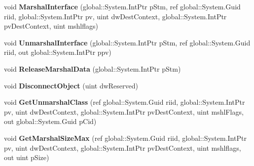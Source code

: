 \begin{DoxyCompactItemize}
void {\bfseries Marshal\+Interface} (global\+::\+System.\+Int\+Ptr p\+Stm, ref global\+::\+System.\+Guid riid, global\+::\+System.\+Int\+Ptr pv, uint dw\+Dest\+Context, global\+::\+System.\+Int\+Ptr pv\+Dest\+Context, uint mshlflags)
\item 
\mbox{\label{interface_system_1_1_runtime_1_1_interop_services_1_1_i_marshal_____system___runtime___windows_runtime_a3e8bcee1d02a9ee6b7ef2e3996b54765}} 
void {\bfseries Unmarshal\+Interface} (global\+::\+System.\+Int\+Ptr p\+Stm, ref global\+::\+System.\+Guid riid, out global\+::\+System.\+Int\+Ptr ppv)
\item 
\mbox{\label{interface_system_1_1_runtime_1_1_interop_services_1_1_i_marshal_____system___runtime___windows_runtime_a3b9d876c6a7a35f23897b4e47568578c}} 
void {\bfseries Release\+Marshal\+Data} (global\+::\+System.\+Int\+Ptr p\+Stm)
\item 
\mbox{\label{interface_system_1_1_runtime_1_1_interop_services_1_1_i_marshal_____system___runtime___windows_runtime_a6c9ed45c61839a823eaeb6e035dd2e25}} 
void {\bfseries Disconnect\+Object} (uint dw\+Reserved)
\item 
\mbox{\label{interface_system_1_1_runtime_1_1_interop_services_1_1_i_marshal_____system___runtime___windows_runtime_ac0f4d724dea939dbf088fe46a53dec1a}} 
void {\bfseries Get\+Unmarshal\+Class} (ref global\+::\+System.\+Guid riid, global\+::\+System.\+Int\+Ptr pv, uint dw\+Dest\+Context, global\+::\+System.\+Int\+Ptr pv\+Dest\+Context, uint mshl\+Flags, out global\+::\+System.\+Guid p\+Cid)
\item 
\mbox{\label{interface_system_1_1_runtime_1_1_interop_services_1_1_i_marshal_____system___runtime___windows_runtime_a79af4aa5ca6d5a68217437912f3c9333}} 
void {\bfseries Get\+Marshal\+Size\+Max} (ref global\+::\+System.\+Guid riid, global\+::\+System.\+Int\+Ptr pv, uint dw\+Dest\+Context, global\+::\+System.\+Int\+Ptr pv\+Dest\+Context, uint mshlflags, out uint p\+Size)

\end{DoxyCompactItemize}
